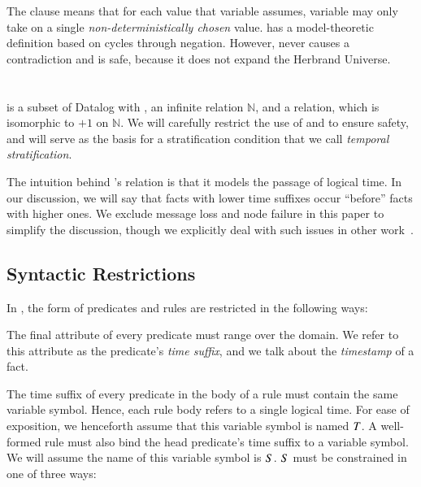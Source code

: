 \noindent{}The  clause means that for each value that
variable  assumes, variable  may only take on a single
{\em non-deterministically chosen} value.   has a
model-theoretic definition based on cycles through negation.  However,
 never causes a contradiction and is safe, because it does not
expand the Herbrand Universe.

\section{\lang}

\lang is a subset of Datalog with , an infinite 
relation $\mathbb{N}$, and a 
relation, which is isomorphic to $+1$ on $\mathbb{N}$.  We will carefully
restrict the use of  and  to ensure safety,
and  will serve as the basis for a stratification condition
that we call {\em temporal stratification}.

The intuition behind \lang's  relation is that it models the
passage of logical time.  In our discussion, we will say that facts with lower
time suffixes occur ``before'' facts with higher ones.  
We exclude message loss and node failure in this paper to simplify the
discussion, though we explicitly deal with such issues in other
work~\cite{dedalus-techr, netdb}.

\subsection{Syntactic Restrictions}
\label{sec:syntaxrestrictions}
In \lang, the form of predicates and rules are restricted in the following ways:

 The final attribute of every \lang
predicate must range over the  domain. 
We refer to this attribute as the predicate's \emph{time suffix}, and we talk about the {\em timestamp} of a fact. 

 The time suffix of every predicate in the
body of a rule must contain the same variable symbol.  Hence, each rule body
refers to a single logical time.  For ease of exposition, we henceforth assume
that this variable symbol is named $\DT$.  A well-formed \lang rule must also
bind the head predicate's time suffix to a variable symbol.  We will assume the
name of this variable symbol is $\DS$. $\DS$ must be constrained in one of
three ways:

